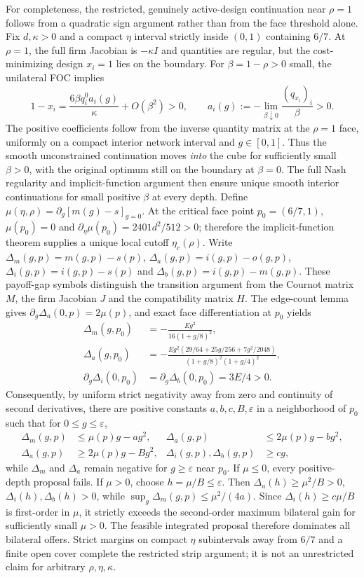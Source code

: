 For completeness, the restricted, genuinely active-design continuation near $\rho=1$ follows from a quadratic sign argument rather than from the face threshold alone. Fix $d,\kappa>0$ and a compact $\eta$ interval strictly inside $(0,1)$ containing $6/7$. At $\rho=1$, the full firm Jacobian is $-\kappa I$ and quantities are regular, but the cost-minimizing design $x_i=1$ lies on the boundary. For $\beta=1-\rho>0$ small, the unilateral FOC implies
\[
1-x_i=\frac{6\beta q_i^0 a_i(g)}{\kappa}+O(\beta^2)>0,\qquad
a_i(g):=-\lim_{\beta\downarrow0}\frac{(q_{x_i})_i}{\beta}>0.
\]
The positive coefficients follow from the inverse quantity matrix at the $\rho=1$ face, uniformly on a compact interior network interval and $g\in[0,1]$. Thus the smooth unconstrained continuation moves \emph{into} the cube for sufficiently small $\beta>0$, with the original optimum still on the boundary at $\beta=0$. The full Nash regularity and implicit-function argument then ensure unique smooth interior continuations for small positive $\beta$ at every depth. Define $\mu(\eta,\rho)=\partial_g[m(g)-s]_{g=0}$. At the critical face point $p_0=(6/7,1)$, $\mu(p_0)=0$ and $\partial_\eta\mu(p_0)=2401d^2/512>0$; therefore the implicit-function theorem supplies a unique local cutoff $\eta_c(\rho)$. Write $\Delta_m(g,p)=m(g,p)-s(p)$, $\Delta_a(g,p)=i(g,p)-o(g,p)$, $\Delta_i(g,p)=i(g,p)-s(p)$ and $\Delta_b(g,p)=i(g,p)-m(g,p)$. These payoff-gap symbols distinguish the transition argument from the Cournot matrix $M$, the firm Jacobian $J$ and the compatibility matrix $H$. The edge-count lemma gives $\partial_g\Delta_a(0,p)=2\mu(p)$, and exact face differentiation at $p_0$ yields
\begin{align*}
\Delta_m(g,p_0)&=-\frac{Eg^2}{16(1+g/8)^2},\\
\Delta_a(g,p_0)&=-\frac{Eg^2(29/64+25g/256+7g^2/2048)}{(1+g/8)^2(1+g/4)^2},\\
\partial_g\Delta_i(0,p_0)&=\partial_g\Delta_b(0,p_0)=3E/4>0.
\end{align*}
Consequently, by uniform strict negativity away from zero and continuity of second derivatives, there are positive constants $a,b,c,B,\varepsilon$ in a neighborhood of $p_0$ such that for $0\le g\le\varepsilon$,
\begin{equation}\label{eq:quadraticstrip}
\begin{aligned}
\Delta_m(g,p)&\le\mu(p)g-ag^2, & \Delta_a(g,p)&\le2\mu(p)g-bg^2,\\
\Delta_a(g,p)&\ge2\mu(p)g-Bg^2,& \Delta_i(g,p),\Delta_b(g,p)&\ge cg,
\end{aligned}
\end{equation}
while $\Delta_m$ and $\Delta_a$ remain negative for $g\ge\varepsilon$ near $p_0$. If $\mu\le0$, every positive-depth proposal fails. If $\mu>0$, choose $h=\mu/B\le\varepsilon$. Then $\Delta_a(h)\ge\mu^2/B>0$, $\Delta_i(h),\Delta_b(h)>0$, while $\sup_g \Delta_m(g,p)\le\mu^2/(4a)$. Since $\Delta_i(h)\ge c\mu/B$ is first-order in $\mu$, it strictly exceeds the second-order maximum bilateral gain for sufficiently small $\mu>0$. The feasible integrated proposal therefore dominates all bilateral offers. Strict margins on compact $\eta$ subintervals away from $6/7$ and a finite open cover complete the restricted strip argument; it is not an unrestricted claim for arbitrary $\rho,\eta,\kappa$.
